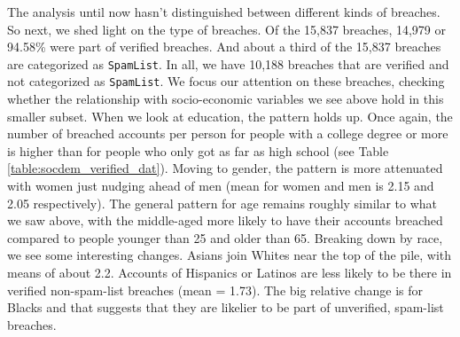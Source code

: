 \documentclass[12pt, letterpaper]{article}
\begin{document}
The analysis until now hasn't distinguished between different kinds of breaches. So next, we shed light on the type of breaches.  Of the 15,837 breaches, 14,979 or 94.58\% were part of verified breaches. And about a third of the 15,837 breaches are categorized as \texttt{SpamList}. In all, we have 10,188 breaches that are verified and not categorized as \texttt{SpamList}. We focus our attention on these breaches, checking whether the relationship with socio-economic variables we see above hold in this smaller subset. When we look at education, the pattern holds up. Once again, the number of breached accounts per person for people with a college degree or more is higher than for people who only got as far as high school (see Table \ref{table:socdem_verified_dat}). Moving to gender, the pattern is more attenuated with women just nudging ahead of men (mean for women and men is 2.15 and 2.05 respectively).  The general pattern for age remains roughly similar to what we saw above, with the middle-aged more likely to have their accounts breached compared to people younger than 25 and older than 65. Breaking down by race, we see some interesting changes. Asians join Whites near the top of the pile, with means of about 2.2. Accounts of Hispanics or Latinos are less likely to be there in verified non-spam-list breaches (mean = 1.73). The big relative change is for Blacks and that suggests that they are likelier to be part of unverified, spam-list breaches.
\end{document}
